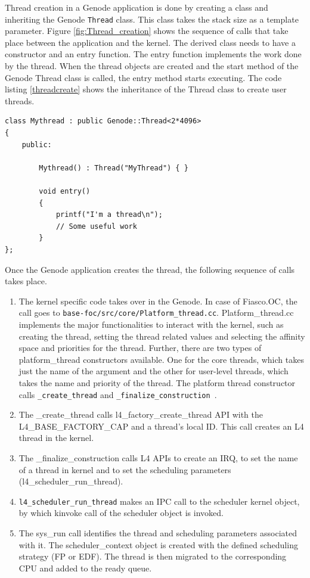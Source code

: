 Thread creation in a Genode application is done by creating a class and inheriting the Genode \texttt{Thread} class. This class takes the stack size as a template parameter. Figure \ref{fig:Thread_creation} shows the sequence of calls that take place between the application and the kernel. The derived class needs to have a constructor and an entry function. The entry function implements the work done by the thread. When the thread objects are created and the start method of the Genode Thread class is called, the entry method starts executing. The code listing \ref{threadcreate} shows the inheritance of the Thread class to create user threads.

\begin{lstlisting}[caption={Thread creation class},label={threadcreate}, style=customcpp]
class Mythread : public Genode::Thread<2*4096>
{
	public:

		Mythread() : Thread("MyThread") { }

		void entry()
		{
			printf("I'm a thread\n");
			// Some useful work
		}
};
\end{lstlisting}

Once the Genode application creates the thread, the following sequence of calls takes place.

\begin{enumerate}
\item The kernel specific code takes over in the Genode. In case of Fiasco.OC, the call goes to \texttt{base-foc/src/core/Platform\_thread.cc}. Platform\_thread.cc implements the major functionalities to interact with the kernel, such as creating the thread, setting the thread related values and selecting the affinity space and priorities for the thread. Further, there are two types of platform\_thread constructors available. One for the core threads, which takes just the name of the argument and the other for user-level threads, which takes the name and priority of the thread.  The platform thread constructor calls \texttt{\_create\_thread} and \texttt{\_finalize\_construction }.

\item The \_create\_thread calls l4\_factory\_create\_thread API with the L4\_BASE\_FACTORY\_CAP and a thread's local ID. This call creates an L4 thread in the kernel. 

\item The \_finalize\_construction calls L4 APIs to create an IRQ, to set the name of a thread in kernel and to set the scheduling parameters (l4\_scheduler\_run\_thread).

\item \texttt{l4\_scheduler\_run\_thread} makes an IPC call to the scheduler kernel object, by which kinvoke call of the scheduler object is invoked.

\item The sys\_run call identifies the thread and scheduling parameters associated with it. The scheduler\_context object is created with the defined scheduling strategy (FP or EDF). The thread is then migrated to the corresponding CPU and added to the ready queue.  
\end{enumerate}

